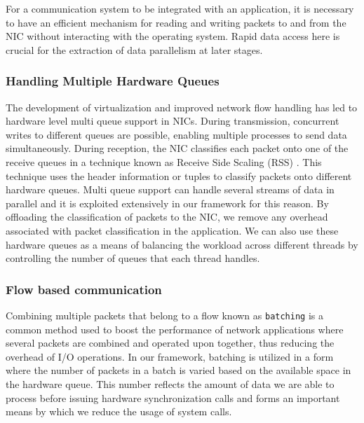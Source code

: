 \documentclass[10pt, conference, compsocconf, reqno]{IEEEtran}
\newcommand{\comment}[1]{}
\begin{document}
For a communication system to be integrated with an application, it is necessary to have an efficient mechanism for reading and writing packets to and from the NIC without interacting with the operating system. Rapid data access here is crucial for the extraction of data parallelism at later stages. \comment{In using the techniques described below we exploit the modern NIC architecture to its full potential.}

\subsubsection{Handling Multiple Hardware Queues}

The development of virtualization and improved network flow handling has led to hardware level multi queue support in NICs. During transmission, concurrent writes to different queues are possible, enabling multiple processes to send data simultaneously. During reception, the NIC classifies each packet onto one of the receive queues in a technique known as Receive Side Scaling (RSS)\cite{micro2008} \cite{intel2010}. This technique uses the header information or tuples to classify packets onto different hardware queues. Multi queue support can handle several streams of data in parallel and it is exploited extensively in our framework for this reason. By offloading the classification of packets to the NIC, we remove any overhead associated with packet classification in the application. We can also use these hardware queues as a means of balancing the workload across different threads by controlling the number of queues that each thread handles. \comment{Since different processes can access these transmit and receive queues, concurrent access to data is possible.}

\subsubsection{Flow based communication}

Combining multiple packets that belong to a flow known as \texttt{batching} is a common method used to boost the performance of network applications where several packets are combined and operated upon together, thus reducing the overhead of I/O operations. In our framework, batching is utilized in a form where the number of packets in a batch is varied based on the available space in the hardware queue. This number reflects the amount of data we are able to process before issuing hardware synchronization calls and forms an important means by which we reduce the usage of system calls.
\end{document}
